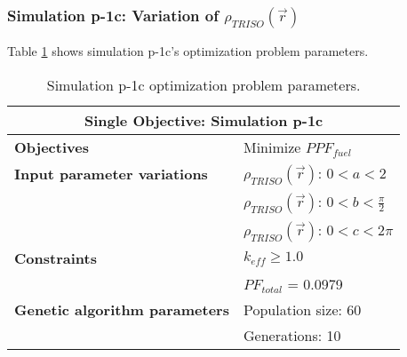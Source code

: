 \subsubsection{Simulation p-1c: Variation of $\rho_{TRISO}(\vec{r})$}
Table \ref{tab:simulationp1c} shows simulation p-1c's optimization problem parameters. 
\begin{table}[htbp!]
    \centering
    \onehalfspacing
    \caption{Simulation p-1c optimization problem parameters.}
	\label{tab:simulationp1c}
    \footnotesize
    \begin{tabular}{l|p{4cm}}
    \hline 
    \multicolumn{2}{c}{\textbf{Single Objective: Simulation p-1c}} \\
    \hline 
    \textbf{Objectives} & Minimize $PPF_{fuel}$ \\
    \hline 
    \textbf{Input parameter variations}
    & $\rho_{TRISO}(\vec{r})$: $0<a<2$ \\
    & $\rho_{TRISO}(\vec{r})$: $0<b<\frac{\pi}{2}$ \\
    & $\rho_{TRISO}(\vec{r})$: $0<c<2\pi$ \\
    \hline
    \textbf{Constraints} & $k_{eff} \geq 1.0$\\ 
    & $PF_{total}$ = 0.0979\\
    \hline 
    \textbf{Genetic algorithm parameters} & Population size: 60 \\
    & Generations: 10 \\
    \hline
    \end{tabular}
\end{table}

